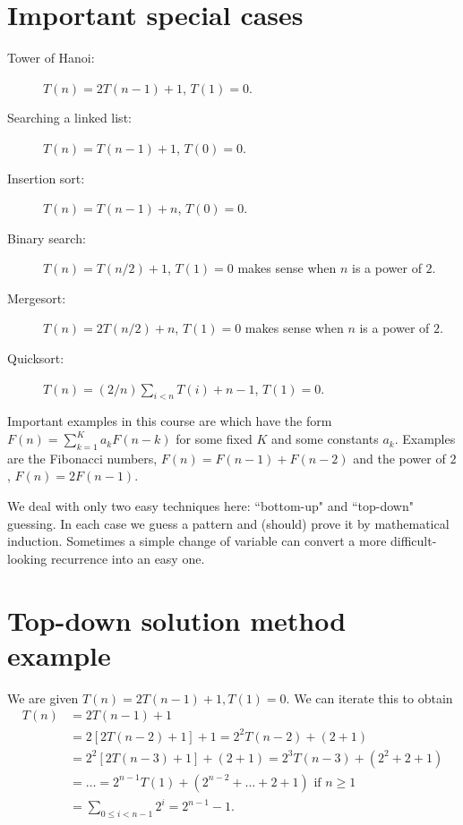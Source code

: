 \section{Important special cases}
\begin{description}
  \item[Tower of Hanoi:] $T(n) = 2 T(n - 1) + 1$, $T(1) = 0$.
  \item[Searching a linked list:] $T(n) = T(n - 1) + 1$, $T(0) = 0$.
  \item[Insertion sort:] $T(n) = T(n-1) + n$, $T(0) = 0$.
  \item[Binary search:] $T(n) = T(n/2) + 1$, $T(1) = 0$ makes sense when $n$ is a power of $2$. 
  \item[Mergesort:] $T(n) = 2T(n/2) + n$, $T(1) = 0$ makes sense when $n$ is a power of $2$.
  \item[Quicksort:] $T(n) = (2/n)\sum_{i<n} T(i) + n-1$, $T(1) = 0$.
\end{description}

Important examples  in this course are  which have the form 
$F(n) = \sum_{k=1}^K a_k F(n - k)$ for some fixed $K$ and some constants $a_k$. 
Examples are the Fibonacci numbers, $F(n) = F(n-1) + F(n-2)$ and the power of $2$, $F(n) = 2F(n-1)$.

We deal with only two easy techniques here: ``bottom-up" and ``top-down" guessing. 
In each case we guess a pattern and (should) prove it by mathematical induction. 
Sometimes a simple change of variable can convert a more difficult-looking recurrence into an easy one. 

\section{Top-down solution method example}
\begin{Boxample}
We are given $T(n) = 2 T(n - 1) + 1, T(1) = 0$. We can iterate this to obtain 
\begin{align*}
T(n) & = 2 T(n - 1) + 1  \\
& = 2 [2 T(n - 2) + 1] + 1 = 2^2 T(n-2) + (2 + 1) \\
& = 2^2 [2T(n - 3) + 1] + (2 + 1) = 2^3 T(n - 3) + (2^2 + 2+ 1)  \\ 
& = \dots = 2^{n-1} T(1) + (2^{n-2} + \dots + 2 + 1)  \text{ if $n \geq 1$} \\
& = \sum_{0\leq i < n-1} 2^i = 2^{n-1} - 1\text{.}
\end{align*}
\end{Boxample}

